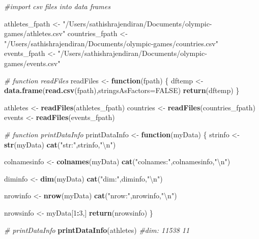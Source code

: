 \documentclass[]{article}
\newenvironment{Shaded}{\begin{snugshade}}{\end{snugshade}}
\newcommand{\CharTok}[1]{\textcolor[rgb]{0.31,0.60,0.02}{#1}}
\newcommand{\CommentTok}[1]{\textcolor[rgb]{0.56,0.35,0.01}{\textit{#1}}}
\newcommand{\ControlFlowTok}[1]{\textcolor[rgb]{0.13,0.29,0.53}{\textbf{#1}}}
\newcommand{\DataTypeTok}[1]{\textcolor[rgb]{0.13,0.29,0.53}{#1}}
\newcommand{\DecValTok}[1]{\textcolor[rgb]{0.00,0.00,0.81}{#1}}
\newcommand{\KeywordTok}[1]{\textcolor[rgb]{0.13,0.29,0.53}{\textbf{#1}}}
\newcommand{\NormalTok}[1]{#1}
\newcommand{\OperatorTok}[1]{\textcolor[rgb]{0.81,0.36,0.00}{\textbf{#1}}}
\newcommand{\OtherTok}[1]{\textcolor[rgb]{0.56,0.35,0.01}{#1}}
\newcommand{\StringTok}[1]{\textcolor[rgb]{0.31,0.60,0.02}{#1}}
\begin{document}
\begin{Shaded}
\begin{Highlighting}[]
\CommentTok{#import csv files into data frames}

\NormalTok{  athletes_fpath <-}\StringTok{ "/Users/sathishrajendiran/Documents/olympic-games/athletes.csv"}
\NormalTok{  countries_fpath <-}\StringTok{ "/Users/sathishrajendiran/Documents/olympic-games/countries.csv"}
\NormalTok{  events_fpath <-}\StringTok{ "/Users/sathishrajendiran/Documents/olympic-games/events.csv"}

  \CommentTok{# function readFiles}
\NormalTok{  readFiles <-}\StringTok{ }\ControlFlowTok{function}\NormalTok{(fpath)}
\NormalTok{    \{}
\NormalTok{    dftemp <-}\StringTok{ }\KeywordTok{data.frame}\NormalTok{(}\KeywordTok{read.csv}\NormalTok{(fpath),}\DataTypeTok{stringsAsFactors=}\OtherTok{FALSE}\NormalTok{)}
    \KeywordTok{return}\NormalTok{(dftemp)}
\NormalTok{    \}}
  
\NormalTok{  athletes <-}\StringTok{ }\KeywordTok{readFiles}\NormalTok{(athletes_fpath) }
\NormalTok{  countries <-}\StringTok{ }\KeywordTok{readFiles}\NormalTok{(countries_fpath) }
\NormalTok{  events <-}\StringTok{ }\KeywordTok{readFiles}\NormalTok{(events_fpath) }

  
\CommentTok{# function printDataInfo}
\NormalTok{  printDataInfo <-}\StringTok{ }\ControlFlowTok{function}\NormalTok{(myData)}
\NormalTok{    \{}
\NormalTok{      strinfo <-}\StringTok{ }\KeywordTok{str}\NormalTok{(myData)}
      \KeywordTok{cat}\NormalTok{(}\StringTok{"str:"}\NormalTok{,strinfo,}\StringTok{"}\CharTok{\textbackslash{}n}\StringTok{"}\NormalTok{)}
      
\NormalTok{      colnamesinfo <-}\StringTok{ }\KeywordTok{colnames}\NormalTok{(myData)}
      \KeywordTok{cat}\NormalTok{(}\StringTok{"colnames:"}\NormalTok{,colnamesinfo,}\StringTok{"}\CharTok{\textbackslash{}n}\StringTok{"}\NormalTok{)}
      
\NormalTok{      diminfo <-}\StringTok{ }\KeywordTok{dim}\NormalTok{(myData)}
      \KeywordTok{cat}\NormalTok{(}\StringTok{"dim:"}\NormalTok{,diminfo,}\StringTok{"}\CharTok{\textbackslash{}n}\StringTok{"}\NormalTok{)}
      
\NormalTok{      nrowinfo <-}\StringTok{ }\KeywordTok{nrow}\NormalTok{(myData)}
      \KeywordTok{cat}\NormalTok{(}\StringTok{"nrow:"}\NormalTok{,nrowinfo,}\StringTok{"}\CharTok{\textbackslash{}n}\StringTok{"}\NormalTok{)}
      
\NormalTok{      nrowsinfo <-}\StringTok{ }\NormalTok{myData[}\DecValTok{1}\OperatorTok{:}\DecValTok{3}\NormalTok{,]}
      \KeywordTok{return}\NormalTok{(nrowsinfo)}
\NormalTok{     \}}
  
\CommentTok{# printDataInfo}
  \KeywordTok{printDataInfo}\NormalTok{(athletes)  }\CommentTok{#dim: 11538 11}
\end{Highlighting}
\end{Shaded}
\end{document}
